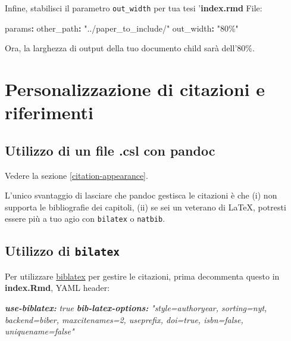 \documentclass[a4paper, 11pt, nobind]{templates/ociamthesis}
\newenvironment{Shaded}{\begin{snugshade}}{\end{snugshade}}
\newcommand{\AnnotationTok}[1]{\textcolor[rgb]{0.56,0.35,0.01}{\textbf{\textit{#1}}}}
\newcommand{\AttributeTok}[1]{\textcolor[rgb]{0.77,0.63,0.00}{#1}}
\newcommand{\CommentTok}[1]{\textcolor[rgb]{0.56,0.35,0.01}{\textit{#1}}}
\newcommand{\FunctionTok}[1]{\textcolor[rgb]{0.00,0.00,0.00}{#1}}
\newcommand{\KeywordTok}[1]{\textcolor[rgb]{0.13,0.29,0.53}{\textbf{#1}}}
\newcommand{\StringTok}[1]{\textcolor[rgb]{0.31,0.60,0.02}{#1}}
\renewenvironment{Shaded}
{
  \vspace{10pt}%
  \begin{snugshade}%
}{%
  \end{snugshade}%
  \vspace{8pt}%
}
\begin{document}
Infine, stabilisci il parametro \texttt{out\_width} per tua tesi '\textbf{index.rmd } File:

\begin{Shaded}
\begin{Highlighting}[]
\FunctionTok{params}\KeywordTok{:}
\AttributeTok{  }\FunctionTok{other\_path}\KeywordTok{:}\AttributeTok{ }\StringTok{"../paper\_to\_include/"}
\AttributeTok{  }\FunctionTok{out\_width}\KeywordTok{:}\AttributeTok{ }\StringTok{"80\%"}
\end{Highlighting}
\end{Shaded}

Ora, la larghezza di output della tuo documento child sarà dell'80\%.

\hypertarget{customising-citations}{%
\section{Personalizzazione di citazioni e riferimenti}\label{customising-citations}}

\hypertarget{utilizzo-di-un-file-.csl-con-pandoc}{%
\subsection{Utilizzo di un file .csl con pandoc}\label{utilizzo-di-un-file-.csl-con-pandoc}}

Vedere la sezione \ref{citation-appearance}.

L'unico svantaggio di lasciare che pandoc gestisca le citazioni è che (i) non supporta le bibliografie dei capitoli, (ii) se sei un veterano di LaTeX, potresti essere più a tuo agio con \texttt{bilatex} o \texttt{natbib}.

\hypertarget{bilatex-custom}{%
\subsection{\texorpdfstring{Utilizzo di \texttt{bilatex}}{Utilizzo di bilatex}}\label{bilatex-custom}}

Per utilizzare \href{https://www.overleaf.com/learn/latex/Bibliography_management_with_biblatex}{biblatex} per gestire le citazioni, prima decommenta questo in \textbf{index.Rmd}, YAML header:

\begin{Shaded}
\begin{Highlighting}[]
\AnnotationTok{use{-}biblatex:}\CommentTok{ true}
\AnnotationTok{bib{-}latex{-}options:}\CommentTok{ "style=authoryear, sorting=nyt, backend=biber, maxcitenames=2, useprefix, doi=true, isbn=false, uniquename=false"}
\end{Highlighting}
\end{Shaded}
\end{document}
